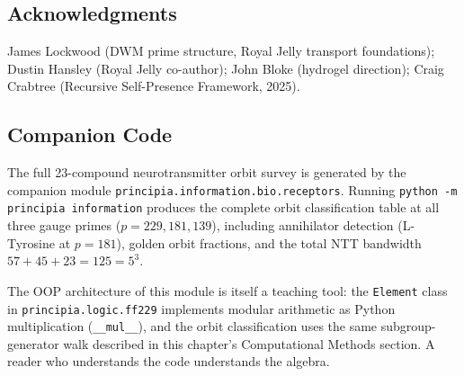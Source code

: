 \subsection*{Acknowledgments}

James Lockwood (DWM prime structure, Royal Jelly transport foundations);
Dustin Hansley (Royal Jelly co-author); John Bloke (hydrogel direction);
Craig Crabtree (Recursive Self-Presence Framework, 2025).

\subsection*{Companion Code}

The full 23-compound neurotransmitter orbit survey is generated by the companion module \texttt{principia.information.bio.receptors}. Running \texttt{python -m principia information} produces the complete orbit classification table at all three gauge primes ($p = 229, 181, 139$), including annihilator detection (L-Tyrosine at $p = 181$), golden orbit fractions, and the total NTT bandwidth $57 + 45 + 23 = 125 = 5^3$.

The OOP architecture of this module is itself a teaching tool: the \texttt{Element} class in \texttt{principia.logic.ff229} implements modular arithmetic as Python multiplication (\texttt{\_\_mul\_\_}), and the orbit classification uses the same subgroup-generator walk described in this chapter's Computational Methods section. A reader who understands the code understands the algebra.



